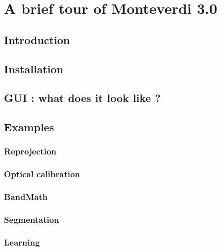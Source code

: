 \chapter{A brief tour of Monteverdi 3.0}\label{chap:Monteverdi} 

\section{Introduction}\label{sec:montintro}

\section{Installation}\label{sec:montinstall}

\section{GUI : what does it look like ?}\label{sec:mongui}

\section{Examples}\label{sec:monexamples}

\subsection{Reprojection}\label{ssec:monrepro}
\subsection{Optical calibration}\label{ssec:monoptical}
\subsection{BandMath}\label{ssec:monbandmath}
\subsection{Segmentation}\label{ssec:monseg}
\subsection{Learning}\label{ssec:monlearn}
